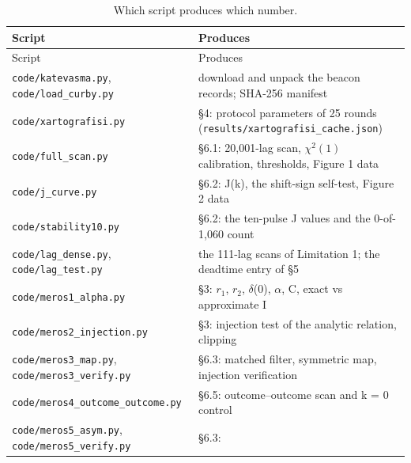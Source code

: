 \documentclass[
  11pt,
]{article}
\begin{document}
\begin{longtable}[]{@{}
  >{\raggedright\arraybackslash}p{}
  >{\raggedright\arraybackslash}p{}@{}}
\caption{Which script produces which number.}\tabularnewline
\toprule\noalign{}
\begin{minipage}[b]{\linewidth}\raggedright
Script
\end{minipage} & \begin{minipage}[b]{\linewidth}\raggedright
Produces
\end{minipage} \\
\midrule\noalign{}
\endfirsthead
\toprule\noalign{}
\begin{minipage}[b]{\linewidth}\raggedright
Script
\end{minipage} & \begin{minipage}[b]{\linewidth}\raggedright
Produces
\end{minipage} \\
\midrule\noalign{}
\endhead
\bottomrule\noalign{}
\endlastfoot
\texttt{code/katevasma.py}, \texttt{code/load\_curby.py} & download and
unpack the beacon records; SHA-256 manifest \\
\texttt{code/xartografisi.py} & \S4: protocol parameters of 25 rounds
(\texttt{results/xartografisi\_cache.json}) \\
\texttt{code/full\_scan.py} & \S6.1: 20,001-lag scan, \(\chi^2(1)\)
calibration, thresholds, Figure 1 data \\
\texttt{code/j\_curve.py} & \S6.2: J(k), the shift-sign self-test,
Figure 2 data \\
\texttt{code/stability10.py} & \S6.2: the ten-pulse J values and the
0-of-1,060 count \\
\texttt{code/lag\_dense.py}, \texttt{code/lag\_test.py} & the 111-lag
scans of Limitation 1; the deadtime entry of \S5 \\
\texttt{code/meros1\_alpha.py} & \S3: \(r_{1}\), \(r_{2}\),
\(\delta\)(0), \(\alpha\), C, exact vs approximate I \\
\texttt{code/meros2\_injection.py} & \S3: injection test of the analytic
relation, clipping \\
\texttt{code/meros3\_map.py}, \texttt{code/meros3\_verify.py} & \S6.3:
matched filter, symmetric map, injection verification \\
\texttt{code/meros4\_outcome\_outcome.py} & \S6.5: outcome--outcome scan
and k = 0 control \\
\texttt{code/meros5\_asym.py}, \texttt{code/meros5\_verify.py} & \S6.3:

\end{longtable}
\end{document}
